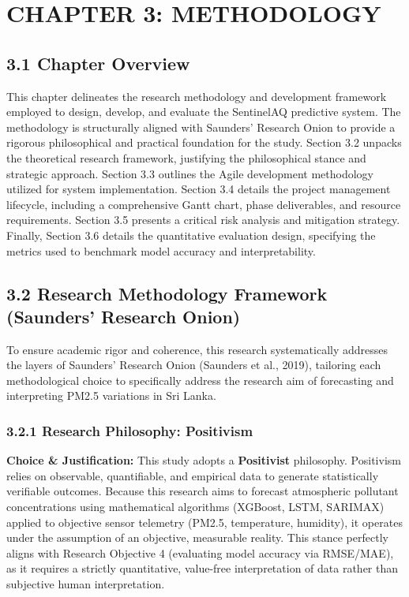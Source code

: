 \chapter{CHAPTER 3: METHODOLOGY}\label{chapter-3-methodology}

\section{3.1 Chapter Overview}\label{chapter-overview}

This chapter delineates the research methodology and development
framework employed to design, develop, and evaluate the SentinelAQ
predictive system. The methodology is structurally aligned with
Saunders' Research Onion to provide a rigorous philosophical and
practical foundation for the study. Section 3.2 unpacks the theoretical
research framework, justifying the philosophical stance and strategic
approach. Section 3.3 outlines the Agile development methodology
utilized for system implementation. Section 3.4 details the project
management lifecycle, including a comprehensive Gantt chart, phase
deliverables, and resource requirements. Section 3.5 presents a critical
risk analysis and mitigation strategy. Finally, Section 3.6 details the
quantitative evaluation design, specifying the metrics used to benchmark
model accuracy and interpretability.

\section{3.2 Research Methodology Framework (Saunders' Research
Onion)}\label{research-methodology-framework-saunders-research-onion}

To ensure academic rigor and coherence, this research systematically
addresses the layers of Saunders' Research Onion (Saunders et al.,
2019), tailoring each methodological choice to specifically address the
research aim of forecasting and interpreting PM2.5 variations in Sri
Lanka.

\subsection{3.2.1 Research Philosophy:
Positivism}\label{research-philosophy-positivism}

\textbf{Choice \& Justification:} This study adopts a
\textbf{Positivist} philosophy. Positivism relies on observable,
quantifiable, and empirical data to generate statistically verifiable
outcomes. Because this research aims to forecast atmospheric pollutant
concentrations using mathematical algorithms (XGBoost, LSTM, SARIMAX)
applied to objective sensor telemetry (PM2.5, temperature, humidity), it
operates under the assumption of an objective, measurable reality. This
stance perfectly aligns with Research Objective 4 (evaluating model
accuracy via RMSE/MAE), as it requires a strictly quantitative,
value-free interpretation of data rather than subjective human
interpretation.

